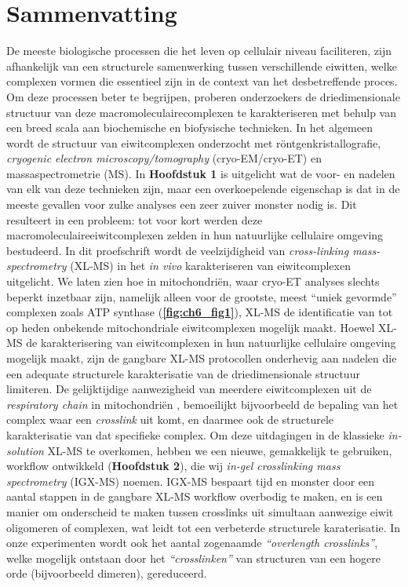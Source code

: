 \section{Sammenvatting}
De meeste biologische processen die het leven op cellulair niveau faciliteren, zijn afhankelijk van een structurele samenwerking tussen verschillende eiwitten, welke complexen vormen die essentieel zijn in de context van het desbetreffende proces. Om deze processen beter te begrijpen, proberen onderzoekers de driedimensionale structuur van deze macromoleculairecomplexen te karakteriseren met behulp van een breed scala aan biochemische en biofysische technieken. In het algemeen wordt de structuur van eiwitcomplexen onderzocht met röntgenkristallografie, \emph{cryogenic electron microscopy/tomography} (cryo-EM/cryo-ET) en massaspectrometrie (MS). In \textbf{Hoofdstuk 1} is uitgelicht wat de voor- en nadelen van elk van deze technieken zijn, maar een overkoepelende eigenschap is dat in de meeste gevallen voor zulke analyses een zeer zuiver monster nodig is. Dit resulteert in een probleem: tot voor kort werden deze macromoleculaireeiwitcomplexen zelden in hun natuurlijke cellulaire omgeving bestudeerd. In dit proefschrift wordt de veelzijdigheid van \emph{cross-linking mass-spectrometry} (XL-MS) in het \emph{in vivo} karakteriseren van eiwitcomplexen uitgelicht. We laten zien hoe in mitochondriën, waar cryo-ET analyses slechts beperkt inzetbaar zijn, namelijk alleen voor de grootste, meest “uniek gevormde” complexen \cite{RN1} zoals ATP synthase (\textbf{\autoref{fig:ch6_fig1}}), XL-MS de identificatie van tot op heden onbekende mitochondriale eiwitcomplexen mogelijk maakt.
Hoewel XL-MS de karakterisering van eiwitcomplexen in hun natuurlijke cellulaire omgeving mogelijk maakt, zijn de gangbare XL-MS protocollen onderhevig aan nadelen die een adequate structurele karakterisatie van de driedimensionale structuur limiteren. De gelijktijdige aanwezigheid van meerdere eiwitcomplexen uit de \emph{respiratory chain} in mitochondriën \cite{RN3}, bemoeilijkt bijvoorbeeld de bepaling van het complex waar een \emph{crosslink} uit komt, en daarmee ook de structurele karakterisatie van dat specifieke complex. Om deze uitdagingen in de klassieke \emph{in-solution} XL-MS te overkomen, hebben we een nieuwe, gemakkelijk te gebruiken, workflow ontwikkeld (\textbf{Hoofdstuk 2}), die wij \emph{in-gel crosslinking mass spectrometry} (IGX-MS) noemen. IGX-MS bespaart tijd en monster door een aantal stappen in de gangbare XL-MS workflow overbodig te maken, en is een manier om onderscheid te maken tussen crosslinks uit simultaan aanwezige eiwit oligomeren of complexen, wat leidt tot een verbeterde structurele karaterisatie. In onze experimenten wordt ook het aantal zogenaamde \emph{“overlength crosslinks”}, welke mogelijk ontstaan door het \emph{“crosslinken”} van structuren van een hogere orde (bijvoorbeeld dimeren), gereduceerd.
